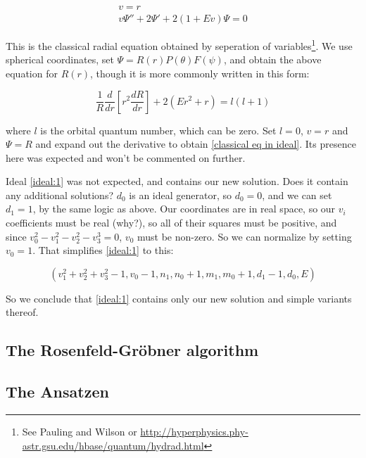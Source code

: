 \documentclass{article}
\begin{document}
\begin{equation}
\label{classical eq in ideal}
\begin{gathered}
v=r \\
v \Psi'' + 2 \Psi' + 2(1 + E v) \Psi = 0
\end{gathered}
\end{equation}

This is the classical radial equation obtained by seperation of variables\footnote{See
Pauling and Wilson or
\url{http://hyperphysics.phy-astr.gsu.edu/hbase/quantum/hydrad.html}}.  We use
spherical coordinates, set $\Psi = R(r)P(\theta)F(\psi)$, and obtain the above equation for $R(r)$,
though it is more commonly written in this form:

\begin{equation}
\frac{1}{R} \frac{d}{dr}\left[ r^2 \frac{dR}{dr}\right] + 2(Er^2 + r) = l(l+1)
\end{equation}

where $l$ is the orbital quantum number, which can be zero.  Set $l=0$, $v=r$ and $\Psi=R$ and
expand out the derivative to obtain \eqref{classical eq in ideal}.  Its presence here was
expected and won't be commented on further.

Ideal \eqref{ideal:1} was not expected, and contains our new solution.  Does it contain any additional solutions?
$d_0$ is an ideal generator,
so $d_0=0$, and we can set $d_1=1$, by the same logic as above.
Our coordinates are in real space, so our $v_i$ coefficients must be real (why?), so all of their squares must
be positive, and since $v_0^2-v_1^2-v_2^2-v_3^3=0$, $v_0$ must be non-zero.  So we can normalize by setting $v_0=1$.
That simplifies \eqref{ideal:1} to this:

\begin{equation}
\left(v_{1}^{2} + v_{2}^{2} + v_{3}^{2} - 1, v_{0} - 1, n_{1}, n_{0} + 1, m_{1}, m_{0} + 1, d_{1} - 1, d_{0}, E\right)
\end{equation}

So we conclude that \eqref{ideal:1} contains only our new solution and simple variants thereof.

\subsection*{The Rosenfeld-Gr\"obner algorithm}

\subsection*{The Ansatzen}
\end{document}
